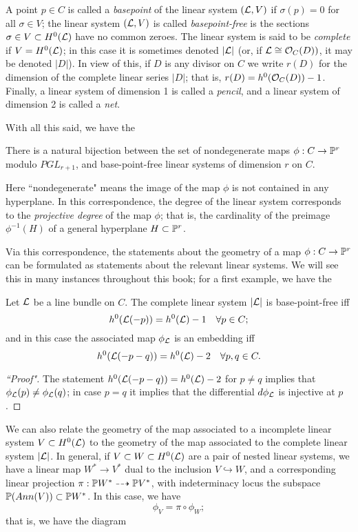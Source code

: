 A point $p \in C$ is called a \emph{basepoint} of the linear system $(\cL,V)$ if $\sigma(p)=0$ for all $\sigma \in V$; the linear system $(\cL,V)$ is called \emph{basepoint-free} is the sections $\sigma \in V \subset H^0(\cL)$ have no common zeroes. The linear system is said to be \emph{complete} if $V = H^0(\cL)$; in this case it is sometimes denoted $|\cL|$ (or, if $\cL \cong \cO_C(D))$, it may be denoted $|D|$). In view of this, if $D$ is any divisor on $C$ we write $r(D)$ for the dimension of the complete linear series $|D|$; that is, $r(D) = h^0(\cO_C(D)) - 1$. Finally, a linear system of dimension 1 is called a \emph{pencil}, and a linear system of dimension 2 is called a \emph{net}.

With all this said, we have the 

\begin{proposition}
There is a natural bijection between the set of nondegenerate maps $\phi : C \to \PP^r$ modulo $PGL_{r+1}$, and base-point-free linear systems of dimension $r$ on $C$.
\end{proposition}

Here ``nondegenerate" means the image of the map $\phi$ is not contained in any hyperplane. In this correspondence, the degree of the linear system corresponds to the \emph{projective degree} of the map $\phi$; that is, the cardinality of the preimage $\phi^{-1}(H)$ of a general hyperplane $H \subset \PP^r$.

Via this correspondence, the statements about the geometry of a map $\phi : C \to \PP^r$ can be formulated as statements about the relevant linear systems. We will see this in many instances throughout this book; for a first example, we have the

\begin{proposition}\label{very ample}
Let $\cL$ be a line bundle on $C$. The complete linear system $|\cL|$ is base-point-free iff
$$
h^0(\cL(-p)) = h^0(\cL) - 1 \quad \forall p \in C;
$$
and in this case the associated map $\phi_\cL$ is an embedding iff
$$
h^0(\cL(-p-q)) = h^0(\cL) - 2 \quad \forall p, q \in C.
$$
\end{proposition} 

\begin{proof}[``Proof"]
The statement $h^0(\cL(-p-q)) = h^0(\cL) - 2$ for $p \neq q$ implies that $\phi_\cL(p) \neq \phi_\cL(q)$; in case $p=q$ it implies that the differential $d\phi_\cL$ is injective at $p$.
\end{proof}

We can also relate the geometry of the map associated to a incomplete linear system $V \subset H^0(\cL)$ to the geometry of the map associated to the complete linear system $|\cL|$. In general, if $V \subset W \subset H^0(\cL)$ are a pair of nested linear systems, we have a linear map $W^* \to V^*$ dual to the inclusion $V \hookrightarrow W$, and a corresponding linear projection $\pi : \PP W^* \dashrightarrow \PP V^*$, with indeterminacy locus the subspace $\PP(Ann(V)) \subset \PP W^*$. In this case, we have 
$$
\phi_V = \pi \circ \phi_W;
$$
that is, we have the diagram 

